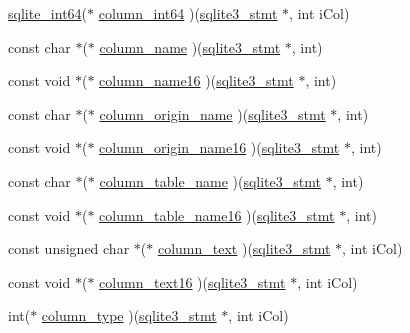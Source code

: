 \begin{DoxyCompactItemize}
\hyperlink{sqlite3_8c_a520a95f9080c018b2fade39885bd2e2a}{sqlite\+\_\+int64}($\ast$ \hyperlink{structsqlite3__api__routines_a1c8174b05fe17b5adf1f51410c2a7574}{column\+\_\+int64} )(\hyperlink{sqlite3_8c_af2a033da1327cdd77f0a174a09aedd0c}{sqlite3\+\_\+stmt} $\ast$, int i\+Col)
\item 
const char $\ast$($\ast$ \hyperlink{structsqlite3__api__routines_a1559513a2896c2f329ab535947d7b01a}{column\+\_\+name} )(\hyperlink{sqlite3_8c_af2a033da1327cdd77f0a174a09aedd0c}{sqlite3\+\_\+stmt} $\ast$, int)
\item 
const void $\ast$($\ast$ \hyperlink{structsqlite3__api__routines_af02fc8b5183845a5cd23f865992f874b}{column\+\_\+name16} )(\hyperlink{sqlite3_8c_af2a033da1327cdd77f0a174a09aedd0c}{sqlite3\+\_\+stmt} $\ast$, int)
\item 
const char $\ast$($\ast$ \hyperlink{structsqlite3__api__routines_a73748d4fc1d34e9a147c1781667bd1c8}{column\+\_\+origin\+\_\+name} )(\hyperlink{sqlite3_8c_af2a033da1327cdd77f0a174a09aedd0c}{sqlite3\+\_\+stmt} $\ast$, int)
\item 
const void $\ast$($\ast$ \hyperlink{structsqlite3__api__routines_ad98229e18c6cddc831512179a1695418}{column\+\_\+origin\+\_\+name16} )(\hyperlink{sqlite3_8c_af2a033da1327cdd77f0a174a09aedd0c}{sqlite3\+\_\+stmt} $\ast$, int)
\item 
const char $\ast$($\ast$ \hyperlink{structsqlite3__api__routines_a1ea5266d202a57ddaffc1b7951b43305}{column\+\_\+table\+\_\+name} )(\hyperlink{sqlite3_8c_af2a033da1327cdd77f0a174a09aedd0c}{sqlite3\+\_\+stmt} $\ast$, int)
\item 
const void $\ast$($\ast$ \hyperlink{structsqlite3__api__routines_a5ab49c39dc125f958df10ecc88fd9b12}{column\+\_\+table\+\_\+name16} )(\hyperlink{sqlite3_8c_af2a033da1327cdd77f0a174a09aedd0c}{sqlite3\+\_\+stmt} $\ast$, int)
\item 
const unsigned char $\ast$($\ast$ \hyperlink{structsqlite3__api__routines_a66f8d504265c0869a251f94e96b1873f}{column\+\_\+text} )(\hyperlink{sqlite3_8c_af2a033da1327cdd77f0a174a09aedd0c}{sqlite3\+\_\+stmt} $\ast$, int i\+Col)
\item 
const void $\ast$($\ast$ \hyperlink{structsqlite3__api__routines_a78b3c83097ee83e73ed99b4267d229e5}{column\+\_\+text16} )(\hyperlink{sqlite3_8c_af2a033da1327cdd77f0a174a09aedd0c}{sqlite3\+\_\+stmt} $\ast$, int i\+Col)
\item 
int($\ast$ \hyperlink{structsqlite3__api__routines_a492811fa922de6f677e915b1cf9a53a0}{column\+\_\+type} )(\hyperlink{sqlite3_8c_af2a033da1327cdd77f0a174a09aedd0c}{sqlite3\+\_\+stmt} $\ast$, int i\+Col)

\end{DoxyCompactItemize}
